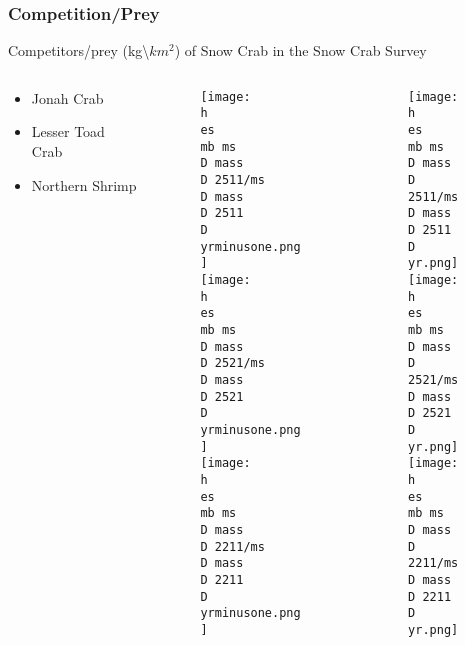 \documentclass{beamer}
\numberwithin{equation}{section}		%
\numberwithin{figure}{section}	   	%
\numberwithin{table}{section}				%
\newcommand{\yr}{2017}
\newcommand{\yrminusone}{2016}
\newcommand{\D}{.}  %
\newcommand{\h}{C:/} %
\newcommand{\es}{bio.data/bio.snowcrab/} %
\newcommand{\mb}{output/maps/survey/snowcrab/annual/bycatch/} %
\begin{document}
\begin{frame}
\frametitle{Competition/Prey}
Competitors/prey (kg\textbackslash$km^2$) of Snow Crab in the Snow Crab Survey
	\begin{columns}
	\begin{column}{0.2\textwidth}
	\begin{itemize}
	  \setlength\itemsep{2em}
		\item[] Jonah Crab 
		\item[] Lesser Toad Crab
		\item[] Northern Shrimp
	\end{itemize}
	\end{column}

	\begin{column}{0.35\textwidth}
 	\begin{figure}
    \texttt{[image: \\h \\es \\mb ms\\D mass\\D 2511/ms\\D mass\\D 2511\\D \\yrminusone.png]}\\   
    \texttt{[image: \\h \\es \\mb ms\\D mass\\D 2521/ms\\D mass\\D 2521\\D \\yrminusone.png]}\\   
    \texttt{[image: \\h \\es \\mb ms\\D mass\\D 2211/ms\\D mass\\D 2211\\D \\yrminusone.png]}  
  	\end{figure}
  	\end{column}

  	\begin{column}{0.35\textwidth}
 		\begin{figure}
			\texttt{[image: \\h \\es \\mb ms\\D mass\\D 2511/ms\\D mass\\D 2511\\D \\yr.png]}\\   
			\texttt{[image: \\h \\es \\mb ms\\D mass\\D 2521/ms\\D mass\\D 2521\\D \\yr.png]}\\   
			\texttt{[image: \\h \\es \\mb ms\\D mass\\D 2211/ms\\D mass\\D 2211\\D \\yr.png]}  
\end{figure} 
  	\end{column}

  	\end{columns}
\end{frame}
\end{document}
